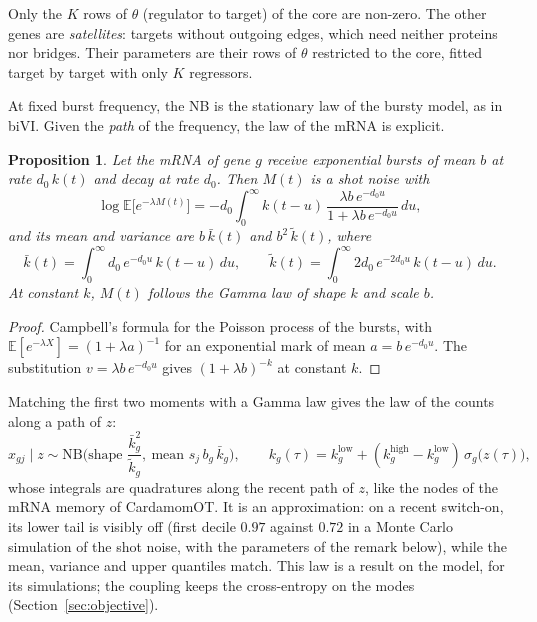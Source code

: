 \documentclass[a4paper, 11pt]{article}
\newcommand{\E}{\mathbb{E}}
\newcommand{\NB}{\mathrm{NB}}
\newcommand{\klow}{k^{\mathrm{low}}}
\newcommand{\khigh}{k^{\mathrm{high}}}
\theoremstyle{plain}
\newtheorem{prop}{Proposition}
\theoremstyle{remark}
\begin{document}
Only the $K$ rows of $\theta$ (regulator to target) of the core are non-zero. The other genes are \emph{satellites}: targets without outgoing edges, which need neither proteins nor bridges. Their parameters are their rows of $\theta$ restricted to the core, fitted target by target with only $K$ regressors.

At fixed burst frequency, the NB is the stationary law of the bursty model, as in biVI. Given the \emph{path} of the frequency, the law of the mRNA is explicit.

\begin{prop}\label{prop:path}
Let the mRNA of gene $g$ receive exponential bursts of mean $b$ at rate $d_0\, k(t)$ and decay at rate $d_0$. Then $M(t)$ is a shot noise with
\[
\log \E\big[e^{-\lambda M(t)}\big] = - d_0 \int_0^\infty k(t-u)\, \frac{\lambda b\, e^{-d_0 u}}{1 + \lambda b\, e^{-d_0 u}}\, du,
\]
and its mean and variance are $b\,\bar k(t)$ and $b^2\, \tilde k(t)$, where
\[
\bar k(t) = \int_0^\infty d_0\, e^{-d_0 u}\, k(t-u)\, du, \qquad
\tilde k(t) = \int_0^\infty 2 d_0\, e^{-2 d_0 u}\, k(t-u)\, du .
\]
At constant $k$, $M(t)$ follows the Gamma law of shape $k$ and scale $b$.
\end{prop}

\begin{proof}
Campbell's formula for the Poisson process of the bursts, with $\E[e^{-\lambda X}] = (1 + \lambda a)^{-1}$ for an exponential mark of mean $a = b\, e^{-d_0 u}$. The substitution $v = \lambda b\, e^{-d_0 u}$ gives $(1 + \lambda b)^{-k}$ at constant $k$.
\end{proof}

Matching the first two moments with a Gamma law gives the law of the counts along a path of $z$:
\begin{equation}\label{eq:decoder}
x_{gj} \mid z \sim \NB\Big(\text{shape } \frac{\bar k_g^2}{\tilde k_g},\ \text{mean } s_j\, b_g\, \bar k_g\Big), \qquad
k_g(\tau) = \klow_g + (\khigh_g - \klow_g)\,\sigma_g\big(z(\tau)\big),
\end{equation}
whose integrals are quadratures along the recent path of $z$, like the nodes of the mRNA memory of CardamomOT. It is an approximation: on a recent switch-on, its lower tail is visibly off (first decile $0.97$ against $0.72$ in a Monte Carlo simulation of the shot noise, with the parameters of the remark below), while the mean, variance and upper quantiles match. This law is a result on the model, for its simulations; the coupling keeps the cross-entropy on the modes (Section~\ref{sec:objective}).
\end{document}
